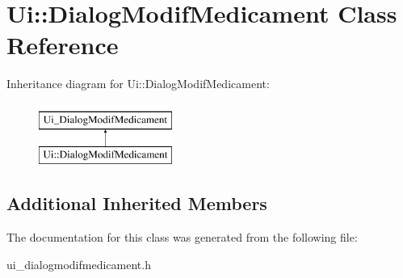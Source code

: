\hypertarget{classUi_1_1DialogModifMedicament}{\section{Ui\-:\-:Dialog\-Modif\-Medicament Class Reference}
\label{classUi_1_1DialogModifMedicament}
}
Inheritance diagram for Ui\-:\-:Dialog\-Modif\-Medicament\-:\begin{figure}[H]
\begin{center}
\leavevmode
\includegraphics[height=2.000000cm]{classUi_1_1DialogModifMedicament}
\end{center}
\end{figure}
\subsection*{Additional Inherited Members}


The documentation for this class was generated from the following file\-:\begin{DoxyCompactItemize}
\item 
ui\-\_\-dialogmodifmedicament.\-h\end{DoxyCompactItemize}
